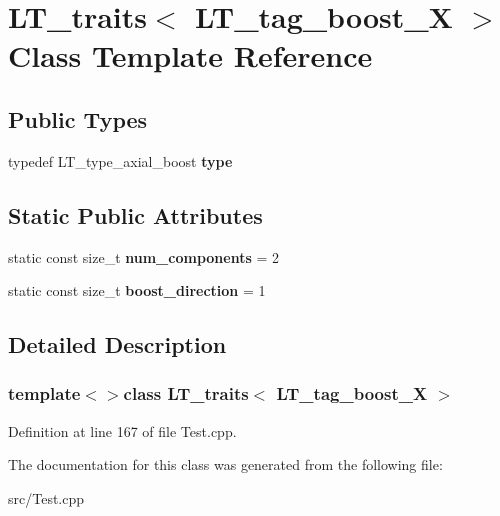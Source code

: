\hypertarget{classLT__traits_3_01LT__tag__boost__X_01_4}{}\section{L\+T\+\_\+traits$<$ L\+T\+\_\+tag\+\_\+boost\+\_\+\+X $>$ Class Template Reference}
\label{classLT__traits_3_01LT__tag__boost__X_01_4}
\subsection*{Public Types}
\begin{DoxyCompactItemize}
\item 
\hypertarget{classLT__traits_3_01LT__tag__boost__X_01_4_a7ed4190fd635dc74741d6b764b3383df}{}typedef L\+T\+\_\+type\+\_\+axial\+\_\+boost {\bfseries type}\label{classLT__traits_3_01LT__tag__boost__X_01_4_a7ed4190fd635dc74741d6b764b3383df}

\end{DoxyCompactItemize}
\subsection*{Static Public Attributes}
\begin{DoxyCompactItemize}
\item 
\hypertarget{classLT__traits_3_01LT__tag__boost__X_01_4_ae5f4d987f1047ce0113edcf130f8a6ff}{}static const size\+\_\+t {\bfseries num\+\_\+components} = 2\label{classLT__traits_3_01LT__tag__boost__X_01_4_ae5f4d987f1047ce0113edcf130f8a6ff}

\item 
\hypertarget{classLT__traits_3_01LT__tag__boost__X_01_4_adf0498560e01ec86b3a232f7d570327a}{}static const size\+\_\+t {\bfseries boost\+\_\+direction} = 1\label{classLT__traits_3_01LT__tag__boost__X_01_4_adf0498560e01ec86b3a232f7d570327a}

\end{DoxyCompactItemize}


\subsection{Detailed Description}
\subsubsection*{template$<$$>$class L\+T\+\_\+traits$<$ L\+T\+\_\+tag\+\_\+boost\+\_\+\+X $>$}



Definition at line 167 of file Test.\+cpp.



The documentation for this class was generated from the following file\+:\begin{DoxyCompactItemize}
\item 
src/Test.\+cpp\end{DoxyCompactItemize}
